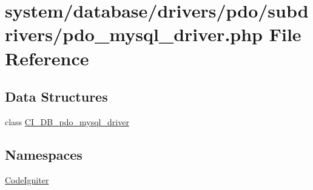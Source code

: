 \hypertarget{pdo__mysql__driver_8php}{}\section{system/database/drivers/pdo/subdrivers/pdo\+\_\+mysql\+\_\+driver.php File Reference}
\label{pdo__mysql__driver_8php}
\subsection*{Data Structures}
\begin{DoxyCompactItemize}
\item 
class \mbox{\hyperlink{class_c_i___d_b__pdo__mysql__driver}{C\+I\+\_\+\+D\+B\+\_\+pdo\+\_\+mysql\+\_\+driver}}
\end{DoxyCompactItemize}
\subsection*{Namespaces}
\begin{DoxyCompactItemize}
\item 
 \mbox{\hyperlink{namespace_code_igniter}{Code\+Igniter}}
\end{DoxyCompactItemize}
